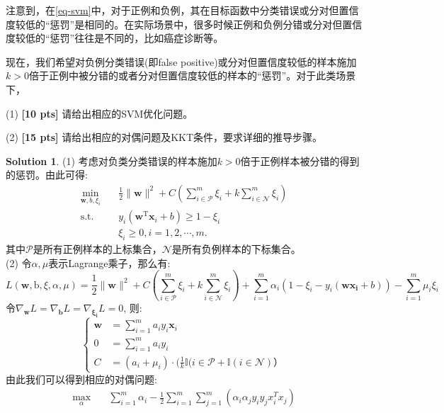 \documentclass[a4paper,UTF8]{article}
\theoremstyle{definition}
\newtheorem*{solution}{Solution}
\begin{document}
注意到，在\eqref{eq-svm}中，对于正例和负例，其在目标函数中分类错误或分对但置信度较低的“惩罚”是相同的。在实际场景中，很多时候正例和负例分错或分对但置信度较低的“惩罚”往往是不同的，比如癌症诊断等。

现在，我们希望对负例分类错误(即false positive)或分对但置信度较低的样本施加$k>0$倍于正例中被分错的或者分对但置信度较低的样本的“惩罚”。对于此类场景下，

(1) \textbf{[10 pts]} 请给出相应的SVM优化问题。

(2) \textbf{[15 pts]} 请给出相应的对偶问题及KKT条件，要求详细的推导步骤。

\begin{solution}
(1) 考虑对负类分类错误的样本施加$k>0$倍于正例样本被分错的得到的惩罚。由此可得:
\begin{equation}
\begin{split}
\min_{\mathbf{w},b,\xi_i}& \quad \frac{1}{2} \lVert \mathbf{w} \rVert^2 + C\left(\sum_{i\in\mathcal{P}}^m\xi_i + k \sum_{i\in\mathcal{N}}^m\xi_i\right)\\
\text{s.t.}&  \quad y_i(\mathbf{w}^\mathrm{T}\mathbf{x}_i + b)\geq 1-\xi_i\\
& \quad \xi_i \geq 0, i = 1,2,\cdots,m.
\end{split}
\end{equation}
其中$\mathcal{P}$是所有正例样本的上标集合，$\mathcal{N}$是所有负例样本的下标集合。
\\(2) 令$\alpha, \mu$表示Lagrange乘子，那么有:
$$L(\mathbf{w}, \text{b}, \xi, \alpha, \mu) = \frac{1}{2}\|\mathbf{w}\|^2 + C\left(\sum_{i\in\mathcal{P}}^m\xi_i + k \sum_{i\in\mathcal{N}}^m\xi_i\right) + 
\sum_{i=1}^{m} \alpha_i(1 - \xi_i -y_i(\mathbf{wx_i}+b)) - \sum_{i=1}^{m} \mu_i\xi_i
$$
令$\nabla_\mathbf{w}L = \nabla_\mathbf{b}L = \nabla_\mathbf{\xi_i}L = 0$, 则:
\begin{equation}\nonumber
\begin{cases}
\mathbf{w} &= \sum_{i=1}^m a_iy_i\mathbf{x}_i\\
0 &= \sum_{i=1}^m a_iy_i\\
C &= (a_i + \mu_i)\cdot (\frac{1}{k}\mathbb{I}(i\in \mathcal{P} + \mathbb{I}(i\in \mathcal{N})）
\end{cases}
\end{equation}
由此我们可以得到相应的对偶问题:
\begin{equation}\nonumber
\begin{split}
\max_{\alpha}& \quad \sum_{i=1}^m \alpha_i - \frac{1}{2}\sum_{i=1}^m\sum_{j=1}^m(\alpha_i\alpha_jy_iy_jx_i^Tx_j)\\

\end{split}
\end{equation}
\end{solution}
\end{document}
